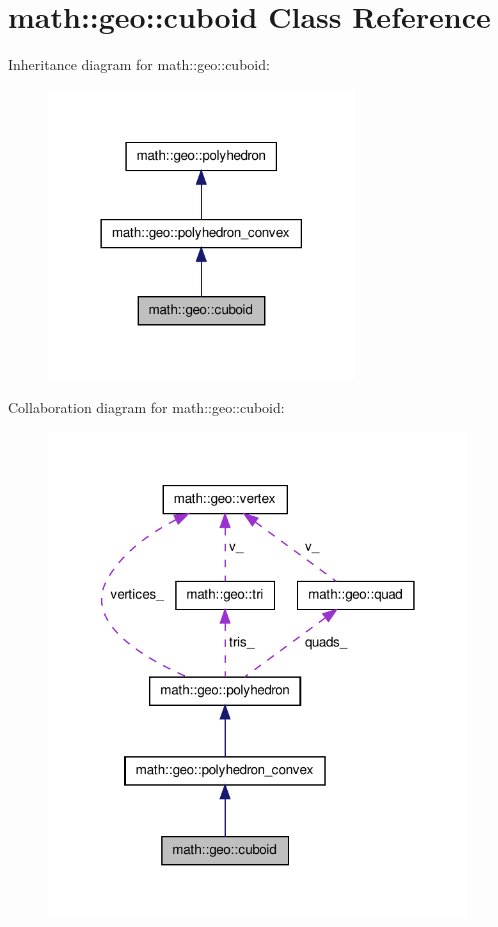 \hypertarget{classmath_1_1geo_1_1cuboid}{\section{math\-:\-:geo\-:\-:cuboid \-Class \-Reference}
\label{classmath_1_1geo_1_1cuboid}
}


\-Inheritance diagram for math\-:\-:geo\-:\-:cuboid\-:
\nopagebreak
\begin{figure}[H]
\begin{center}
\leavevmode
\includegraphics[width=230pt]{classmath_1_1geo_1_1cuboid__inherit__graph}
\end{center}
\end{figure}


\-Collaboration diagram for math\-:\-:geo\-:\-:cuboid\-:
\nopagebreak
\begin{figure}[H]
\begin{center}
\leavevmode
\includegraphics[width=314pt]{classmath_1_1geo_1_1cuboid__coll__graph}
\end{center}
\end{figure}
